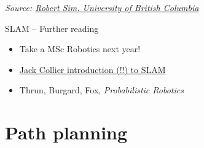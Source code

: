 \documentclass[compress]{beamer}
\newcommand{\source}[2]{{\tiny\it Source: \href{#1}{#2}}}
\begin{document}
\begin{frame}[plain]

    \begin{center}

    \source{http://youtu.be/Q1ipn42rMh8}{Robert Sim, University of British Columbia}
    \end{center}

\end{frame}



\begin{frame}{SLAM -- Further reading}

    \begin{itemize}
        \item Take a MSc Robotics next year!
        \item \href{http://www.computerrobotvision.org/2010/slam_camp/collier_intro.pdf}{Jack
            Collier introduction (!!) to SLAM}
        \item Thrun, Burgard, Fox, \emph{Probabilistic Robotics}
    \end{itemize}
\end{frame}

\section{Path planning}
\end{document}

